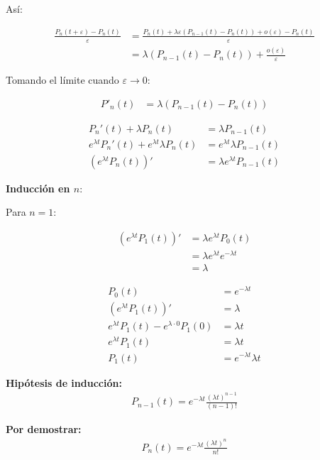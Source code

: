 \documentclass[12pt,a4paper]{article}
\begin{document}
Así:

\begin{align*}
\frac{P_n(t+\varepsilon) - P_n(t)}{\varepsilon} 
&= \frac{P_n(t) + \lambda \varepsilon (P_{n-1}(t) - P_n(t)) + o(\varepsilon) - P_n(t)}{\varepsilon} \\
&= \lambda (P_{n-1}(t) - P_n(t)) + \frac{o(\varepsilon)}{\varepsilon}
\end{align*}

Tomando el límite cuando $\varepsilon \to 0$:

\begin{align*}
P'_n(t) &= \lambda (P_{n-1}(t) - P_n(t))
\end{align*}

\begin{align*}
P_n'(t) + \lambda P_n(t) &= \lambda P_{n-1}(t) \\
e^{\lambda t} P_n'(t) + e^{\lambda t} \lambda P_n(t) &= e^{\lambda t} \lambda P_{n-1}(t) \\
\left(e^{\lambda t} P_n(t)\right)' &= \lambda e^{\lambda t} P_{n-1}(t)
\end{align*}

\textbf{Inducción en $n$}:

Para $n=1$:

\begin{align*}
\left(e^{\lambda t} P_1(t)\right)' &= \lambda e^{\lambda t} P_0(t) \\
                                   &= \lambda e^{\lambda t} e^{-\lambda t} \\
                                   &= \lambda
\end{align*}

\begin{align*}
P_0(t) &= e^{-\lambda t} \\
\left(e^{\lambda t} P_1(t)\right)' &= \lambda \\
e^{\lambda t} P_1(t) - e^{\lambda \cdot 0} P_1(0) &= \lambda t \\
e^{\lambda t} P_1(t) &= \lambda t \\
P_1(t) &= e^{-\lambda t} \lambda t
\end{align*}

\textbf{Hipótesis de inducción:}
\begin{align*}
P_{n-1}(t) = e^{-\lambda t} \frac{(\lambda t)^{n-1}}{(n-1)!}
\end{align*}

\textbf{Por demostrar:}
\begin{align*}
P_n(t) = e^{-\lambda t} \frac{(\lambda t)^n}{n!}
\end{align*}
\end{document}
